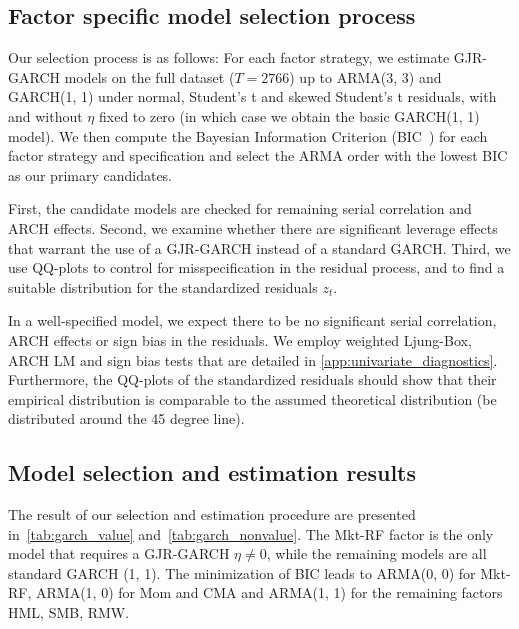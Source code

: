 
\subsection{Factor specific model selection process} %
\label{sub:selection_process}

Our selection process is as follows: For each factor strategy, we estimate GJR-GARCH models on the full dataset ($T = 2766$) up to ARMA(3, 3) and GARCH(1, 1) under normal, Student's t and skewed Student's t residuals, with and without $\eta$ fixed to zero (in which case we obtain the basic GARCH(1, 1) model). We then compute the Bayesian Information Criterion (BIC~\autocite{Schwarz1978}) for each factor strategy and specification and select the ARMA order with the lowest BIC as our primary candidates.

First, the candidate models are checked for remaining serial correlation and ARCH effects. Second, we examine whether there are significant leverage effects that warrant the use of a GJR-GARCH instead of a standard GARCH. Third, we use QQ-plots to control for misspecification in the residual process, and to find a suitable distribution for the standardized residuals $z_t$.

In a well-specified model, we expect there to be no significant serial correlation, ARCH effects or sign bias in the residuals. We employ weighted Ljung-Box, ARCH LM and sign bias tests that are detailed in \autoref{app:univariate_diagnostics}. Furthermore, the QQ-plots of the standardized residuals should show that their empirical distribution is comparable to the assumed theoretical distribution (be distributed around the 45 degree line).


  

\subsection{Model selection and estimation results}
\label{sub:uni_selection_estimation_results}

The result of our selection and estimation procedure are presented in~\autoref{tab:garch_value} and~\autoref{tab:garch_nonvalue}. The Mkt-RF factor is the only model that requires a GJR-GARCH $\eta \neq 0$, while the remaining models are all standard GARCH (1, 1). The minimization of BIC leads to ARMA(0, 0) for Mkt-RF, ARMA(1, 0) for Mom and CMA and ARMA(1, 1) for the remaining factors HML, SMB, RMW. 


